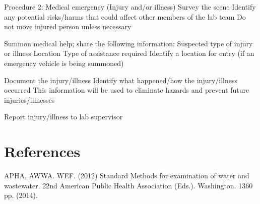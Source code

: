 \documentclass[12pt]{../SOP2}
\begin{document}
Procedure 2: Medical emergency (Injury and/or illness)
Survey the scene
Identify any potential risks/harms that could affect other members of the lab team
Do not move injured person unless necessary

Summon medical help; share the following information:
Suspected type of injury or illness
Location
Type of assistance required
Identify a location for entry (if an emergency vehicle is being summoned)

Document the injury/illness
Identify what happened/how the injury/illness occurred
This information will be used to eliminate hazards and prevent future injuries/illnesses

Report injury/illness to lab supervisor


\section{References}

\NP APHA, AWWA. WEF. (2012) Standard Methods for examination of water and wastewater. 22nd American Public Health Association (Eds.). Washington. 1360 pp. (2014).
\end{document}
